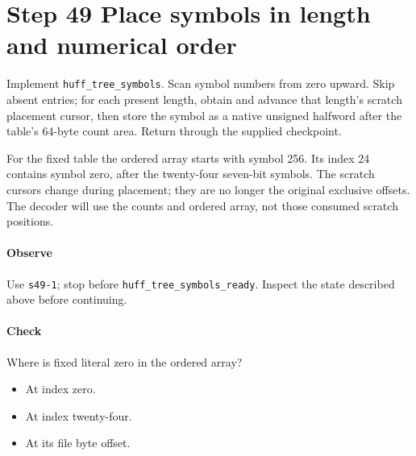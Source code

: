 \section{Step 49 Place symbols in length and numerical order}\label{png-huff-s49}
Implement \texttt{huff\_tree\_symbols}. Scan symbol numbers from zero upward. Skip absent entries; for each present length, obtain and advance that length's scratch placement cursor, then store the symbol as a native unsigned halfword after the table's 64-byte count area. Return through the supplied checkpoint.

For the fixed table the ordered array starts with symbol 256. Its index 24 contains symbol zero, after the twenty-four seven-bit symbols. The scratch cursors change during placement; they are no longer the original exclusive offsets. The decoder will use the counts and ordered array, not those consumed scratch positions.

\paragraph{Observe} Use \texttt{s49-1}; stop before \texttt{huff\_tree\_symbols\_ready}. Inspect the state described above before continuing.

\paragraph{Check} Where is fixed literal zero in the ordered array?
\begin{itemize}
  \item[A.] At index zero.
  \item[B.] At index twenty-four.
  \item[C.] At its file byte offset.
\end{itemize}
